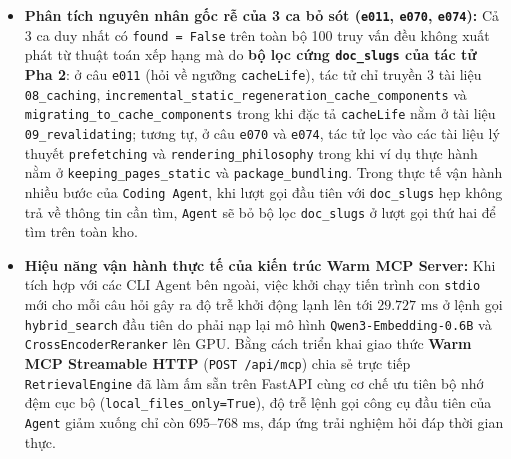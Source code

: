 \begin{itemize}
\begin{enumerate}
        \item \textit{Kéo ngược các phân đoạn dài bị Reranker hạ bậc về lại hạng 1}: Nhờ quy tắc ưu tiên giỏ giao \texttt{both} ($\mathcal{H}_{\text{sem}} \cap \mathcal{H}_{\text{verb}}$) lên trước \texttt{semantic\_only}, \textbf{10 câu hỏi} bị tầng Cross-Encoder làm tụt hạng ở cấu hình (4) gồm \texttt{e007} ($2 \to 1$), \texttt{e012} ($5 \to 1$), \texttt{e018} ($2 \to 1$), \texttt{e029} ($7 \to 1$), \texttt{e031} ($3 \to 1$), \texttt{e035} ($2 \to 1$), \texttt{e079} ($2 \to 1$), \texttt{e086} ($4 \to 1$), \texttt{e096} ($3 \to 1$) và \texttt{e098} ($4 \to 1$) đã được kéo thẳng về vị trí số 1 nhờ chứa đúng mẫu \texttt{pattern} (\texttt{listen(0)}, \texttt{lifo}, \texttt{cleanup}, \texttt{ticketKeys}).
    \end{enumerate}
    \item \textbf{Phân tích nguyên nhân gốc rễ của 3 ca bỏ sót (\texttt{e011}, \texttt{e070}, \texttt{e074}):} Cả 3 ca duy nhất có \texttt{found = False} trên toàn bộ 100 truy vấn đều không xuất phát từ thuật toán xếp hạng mà do \textbf{bộ lọc cứng \texttt{doc\_slugs} của tác tử Pha 2}: ở câu \texttt{e011} (hỏi về ngưỡng \texttt{cacheLife}), tác tử chỉ truyền 3 tài liệu \nolinkurl{08_caching}, \nolinkurl{incremental_static_regeneration_cache_components} và \nolinkurl{migrating_to_cache_components} trong khi đặc tả \texttt{cacheLife} nằm ở tài liệu \nolinkurl{09_revalidating}; tương tự, ở câu \texttt{e070} và \texttt{e074}, tác tử lọc vào các tài liệu lý thuyết \nolinkurl{prefetching} và \nolinkurl{rendering_philosophy} trong khi ví dụ thực hành nằm ở \nolinkurl{keeping_pages_static} và \nolinkurl{package_bundling}. Trong thực tế vận hành nhiều bước của \texttt{Coding Agent}, khi lượt gọi đầu tiên với \texttt{doc\_slugs} hẹp không trả về thông tin cần tìm, \texttt{Agent} sẽ bỏ bộ lọc \texttt{doc\_slugs} ở lượt gọi thứ hai để tìm trên toàn kho.
    \item \textbf{Hiệu năng vận hành thực tế của kiến trúc Warm MCP Server:} Khi tích hợp với các CLI Agent bên ngoài, việc khởi chạy tiến trình con \texttt{stdio} mới cho mỗi câu hỏi gây ra độ trễ khởi động lạnh lên tới $29.727\text{ ms}$ ở lệnh gọi \texttt{hybrid\_search} đầu tiên do phải nạp lại mô hình \texttt{Qwen3-Embedding-0.6B} và \texttt{CrossEncoderReranker} lên GPU. Bằng cách triển khai giao thức \textbf{Warm MCP Streamable HTTP} (\texttt{POST /api/mcp}) chia sẻ trực tiếp \texttt{RetrievalEngine} đã làm ấm sẵn trên FastAPI cùng cơ chế ưu tiên bộ nhớ đệm cục bộ (\texttt{local\_files\_only=True}), độ trễ lệnh gọi công cụ đầu tiên của \texttt{Agent} giảm xuống chỉ còn $695\text{--}768\text{ ms}$, đáp ứng trải nghiệm hỏi đáp thời gian thực.
\end{itemize}

